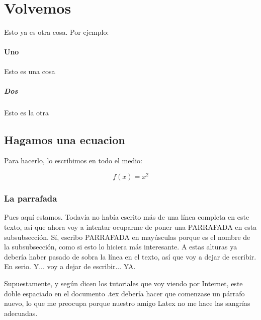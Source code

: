 \documentclass[12pt]{article}%
\begin{document}
	\section{Volvemos}
		Esto ya es otra cosa. Por ejemplo:
		
	\paragraph{Uno}
		Esto es una cosa
		
	\subparagraph{Dos}
		Esto es la otra
		
	\subsection{Hagamos una ecuacion}
		Para hacerlo, lo escribimos en todo el medio:
		
	\begin{equation}
		f(x)=x^2
	\end{equation}
	
	\subsubsection{La parrafada}
		Pues aquí estamos. Todavía no había escrito más de una línea completa en este texto, así que ahora voy a intentar ocuparme de poner una PARRAFADA en esta subsubsección. Sí, escribo PARRAFADA en mayúsculas porque es el nombre de la subsubsección, como si esto lo hiciera más interesante. A estas alturas ya debería haber pasado de sobra la línea en el texto, así que voy a dejar de escribir. En serio. Y... voy a dejar de escribir... YA.
		
		Supuestamente, y según dicen los tutoriales que voy viendo por Internet, este doble espaciado en el documento .tex debería hacer que comenzase un párrafo nuevo, lo que me preocupa porque nuestro amigo Latex no me hace las sangrías adecuadas.
	
\end{document}
